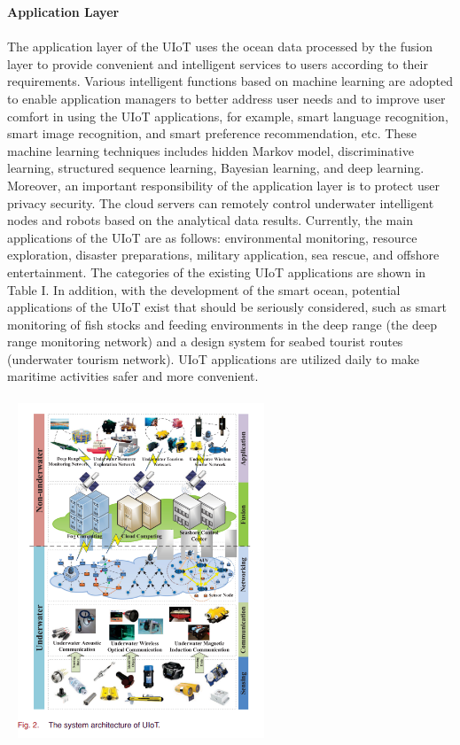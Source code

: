 \documentclass[a4paper,12pt]{article}
\begin{document}
\begin{multicols}{2}
\item\textbf{Application Layer}\\
\\
The application layer of the UIoT uses the ocean data processed by the fusion layer to provide convenient and intelligent services to users according to their requirements. Various intelligent functions based on machine learning are adopted to enable application managers to better address user needs and to improve user comfort in using the UIoT applications, for example, smart language recognition, smart image recognition, and smart preference recommendation, etc. These machine learning techniques includes hidden Markov model, discriminative learning, structured sequence learning, Bayesian learning, and deep learning. Moreover, an important responsibility of the application layer is to protect user privacy security. The cloud servers can remotely control underwater intelligent nodes and robots based on the analytical data results. Currently, the main applications of the UIoT are as follows: environmental monitoring, resource exploration, disaster preparations, military application, sea rescue, and offshore entertainment. The categories of the existing UIoT applications are shown in Table I. In addition, with the development of the smart ocean, potential applications of the UIoT exist that should be seriously considered, such as smart monitoring of fish stocks and feeding environments in the deep range (the deep range monitoring network) and a design system for seabed tourist routes (underwater tourism network). UIoT applications are utilized daily to make maritime activities safer and more convenient.
\\
\\
\includegraphics[width=8cm,height=10cm,keepaspectratio]{fig2.png}

\end{multicols}
\end{document}
